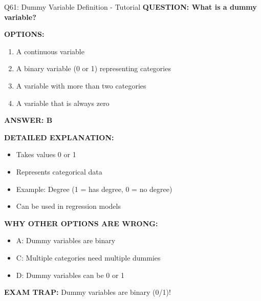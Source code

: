 \documentclass[8pt]{beamer}
\begin{document}
	\begin{frame}{Q61: Dummy Variable Definition - Tutorial}
		\fontsize{6.5}{7.5}\selectfont
		\textbf{QUESTION: What is a dummy variable?}
		
		\vspace{0.1cm}
		\textbf{OPTIONS:}
		\begin{enumerate}
			\item A continuous variable
			\item A binary variable (0 or 1) representing categories
			\item A variable with more than two categories
			\item A variable that is always zero
		\end{enumerate}
		
		\vspace{0.1cm}
		\textcolor{myblue}{\textbf{ANSWER: B}}
		
		\vspace{0.1cm}
		\textbf{DETAILED EXPLANATION:}
		\begin{itemize}
			\item Takes values 0 or 1
			\item Represents categorical data
			\item Example: Degree (1 = has degree, 0 = no degree)
			\item Can be used in regression models
		\end{itemize}
		
		\vspace{0.1cm}
		\textcolor{myred}{\textbf{WHY OTHER OPTIONS ARE WRONG:}}
		\begin{itemize}
			\item \textcolor{myred}{A:} Dummy variables are binary
			\item \textcolor{myred}{C:} Multiple categories need multiple dummies
			\item \textcolor{myred}{D:} Dummy variables can be 0 or 1
		\end{itemize}
		
		\textcolor{myred}{\textbf{EXAM TRAP:}} Dummy variables are \textcolor{myblue}{binary (0/1)}!
	\end{frame}
	
\end{document}
